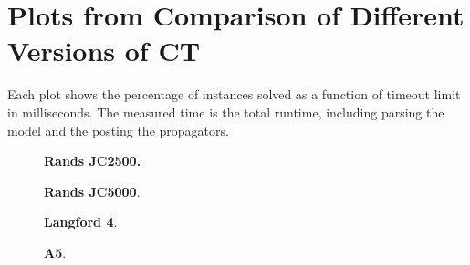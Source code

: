 \documentclass[a4paper,11pt]{article}
\newcommand{\Chapref}[1]{Section~\ref{#1}}
\numberwithin{equation}{section}
\begin{document}






\newpage
\appendix
\section{Plots from Comparison of Different Versions of CT}
\label{app:compare-ct}

Each plot shows the percentage of instances solved as a function
of timeout limit in milliseconds. The measured time is the total
runtime, including parsing the model and the posting
the propagators.

\vspace{2cm}

\begin{figure}[H]
  \begin{minipage}[b][8cm][s]{0.45\textwidth}
    \centering
    \vfill
    \begin{tikzpicture}[scale=0.9]
      
    \end{tikzpicture}
    \vfill
    \caption{\textbf{Rands JC2500.} }
    \vspace{\baselineskip}
  \end{minipage}\qquad
  \begin{minipage}[b][8cm][s]{0.45\textwidth}
    \centering
    \vfill
    \begin{tikzpicture}[scale=0.9]
      
    \end{tikzpicture}
    \vfill
    \caption{\textbf{Rands JC5000}. }
    \vspace{\baselineskip}
  \end{minipage}\qquad
\end{figure}
\begin{figure}[H]
  \begin{minipage}[b][8cm][s]{0.45\textwidth}
    \centering
    \vfill
    \begin{tikzpicture}[scale=0.9]
      
    \end{tikzpicture}
    \vfill
    \caption{\textbf{Langford 4}.}
    \vspace{\baselineskip}
  \end{minipage}\qquad
  \begin{minipage}[b][8cm][s]{0.45\textwidth}
    \centering
    \vfill
    \begin{tikzpicture}[scale=0.9]
      
    \end{tikzpicture}
    \vfill
    \caption{\textbf{A5}.}
    \vspace{\baselineskip}
  \end{minipage}\qquad

\end{figure}
\end{document}
